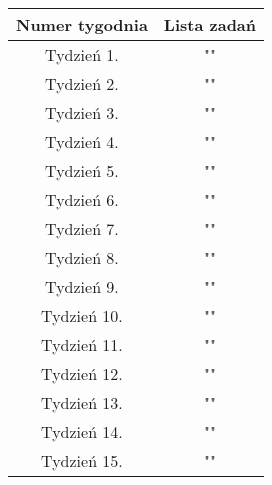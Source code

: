 \documentclass{article}
\begin{document}
\begin{center}
	\begin{tabular}{|c|c|}
	\hline
	Numer tygodnia & Lista zadań \\
	\hline
	Tydzień 1. & "" \\
	\hline
	Tydzień 2. & "" \\
	\hline
	Tydzień 3. & "" \\
	\hline
	Tydzień 4. & "" \\
	\hline
	Tydzień 5. & "" \\
	\hline
	Tydzień 6. & "" \\
	\hline
	Tydzień 7. & "" \\
	\hline
	Tydzień 8. & "" \\
	\hline
	Tydzień 9. & "" \\
	\hline
	Tydzień 10. & "" \\
	\hline
	Tydzień 11. & "" \\
	\hline
	Tydzień 12. & "" \\
	\hline
	Tydzień 13. & "" \\
	\hline
	Tydzień 14. & "" \\
	\hline
	Tydzień 15. & "" \\
	\hline
	\end{tabular}
\end{center}
\end{document}
